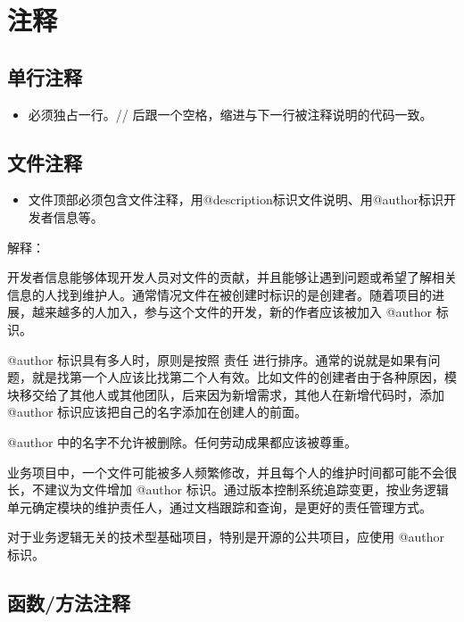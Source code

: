 \documentclass[]{report}
\providecommand{\tightlist}{%
  \setlength{\itemsep}{0pt}\setlength{\parskip}{0pt}}
\begin{document}
\hypertarget{ux6ce8ux91ca-1}{%
\section{注释}\label{ux6ce8ux91ca-1}}

\hypertarget{ux5355ux884cux6ce8ux91ca}{%
\subsection{单行注释}\label{ux5355ux884cux6ce8ux91ca}}

\begin{itemize}
\tightlist
\item
  必须独占一行。// 后跟一个空格，缩进与下一行被注释说明的代码一致。
\end{itemize}

\hypertarget{ux6587ux4ef6ux6ce8ux91ca}{%
\subsection{文件注释}\label{ux6587ux4ef6ux6ce8ux91ca}}

\begin{itemize}
\tightlist
\item
  文件顶部必须包含文件注释，用@description标识文件说明、用@author标识开发者信息等。
\end{itemize}

解释：

开发者信息能够体现开发人员对文件的贡献，并且能够让遇到问题或希望了解相关信息的人找到维护人。通常情况文件在被创建时标识的是创建者。随着项目的进展，越来越多的人加入，参与这个文件的开发，新的作者应该被加入
@author 标识。

@author 标识具有多人时，原则是按照 责任
进行排序。通常的说就是如果有问题，就是找第一个人应该比找第二个人有效。比如文件的创建者由于各种原因，模块移交给了其他人或其他团队，后来因为新增需求，其他人在新增代码时，添加
@author 标识应该把自己的名字添加在创建人的前面。

@author 中的名字不允许被删除。任何劳动成果都应该被尊重。

业务项目中，一个文件可能被多人频繁修改，并且每个人的维护时间都可能不会很长，不建议为文件增加
@author
标识。通过版本控制系统追踪变更，按业务逻辑单元确定模块的维护责任人，通过文档跟踪和查询，是更好的责任管理方式。

对于业务逻辑无关的技术型基础项目，特别是开源的公共项目，应使用 @author
标识。

\hypertarget{ux51fdux6570ux65b9ux6cd5ux6ce8ux91ca}{%
\subsection{函数/方法注释}\label{ux51fdux6570ux65b9ux6cd5ux6ce8ux91ca}}
\end{document}
